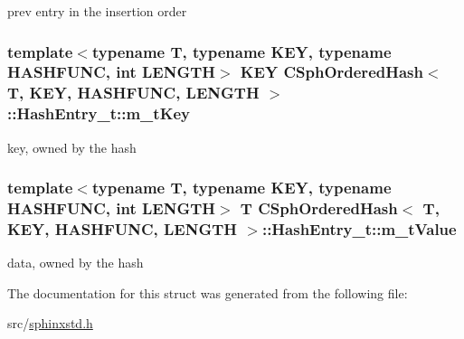 prev entry in the insertion order 

\hypertarget{structCSphOrderedHash_1_1HashEntry__t_a0080a4842b4734407c5312a9e891e257}{
\subsubsection[{m\-\_\-t\-Key}]{\setlength{\rightskip}{0pt plus 5cm}template$<$typename T, typename K\-E\-Y, typename H\-A\-S\-H\-F\-U\-N\-C, int L\-E\-N\-G\-T\-H$>$ K\-E\-Y {\bf C\-Sph\-Ordered\-Hash}$<$ T, K\-E\-Y, H\-A\-S\-H\-F\-U\-N\-C, L\-E\-N\-G\-T\-H $>$\-::Hash\-Entry\-\_\-t\-::m\-\_\-t\-Key}}\label{structCSphOrderedHash_1_1HashEntry__t_a0080a4842b4734407c5312a9e891e257}


key, owned by the hash 

\hypertarget{structCSphOrderedHash_1_1HashEntry__t_ad78ef6471453564c5ada53bdbb525e96}{
\subsubsection[{m\-\_\-t\-Value}]{\setlength{\rightskip}{0pt plus 5cm}template$<$typename T, typename K\-E\-Y, typename H\-A\-S\-H\-F\-U\-N\-C, int L\-E\-N\-G\-T\-H$>$ T {\bf C\-Sph\-Ordered\-Hash}$<$ T, K\-E\-Y, H\-A\-S\-H\-F\-U\-N\-C, L\-E\-N\-G\-T\-H $>$\-::Hash\-Entry\-\_\-t\-::m\-\_\-t\-Value}}\label{structCSphOrderedHash_1_1HashEntry__t_ad78ef6471453564c5ada53bdbb525e96}


data, owned by the hash 



The documentation for this struct was generated from the following file\-:\begin{DoxyCompactItemize}
\item 
src/\hyperlink{sphinxstd_8h}{sphinxstd.\-h}\end{DoxyCompactItemize}
